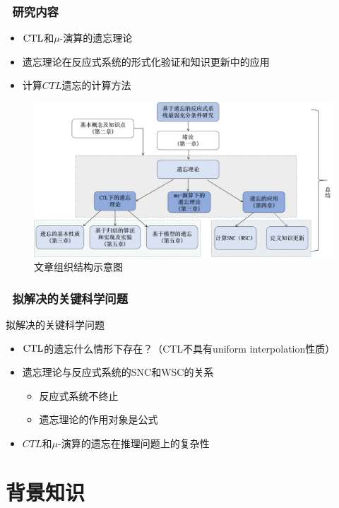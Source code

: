 \documentclass[9pt, CJK]{beamer}
\begin{document}
\begin{frame}
	\frametitle{~研究内容}
		\begin{itemize}
		\item  $\textrm{CTL}$和$\mu$-演算的遗忘理论
		\item 遗忘理论在反应式系统的形式化验证和知识更新中的应用
		\item 计算$CTL$遗忘的计算方法
	\end{itemize}
	\begin{figure}
		\includegraphics[scale=0.3]{figures/zuzhi}
		\caption{文章组织结构示意图}
	\end{figure}
\end{frame}

\begin{frame}
	\frametitle{~拟解决的关键科学问题}
{\footnotesize
	\begin{block}{拟解决的关键科学问题}
		\begin{itemize}
			\item  $\textrm{CTL}$的遗忘什么情形下存在？（CTL不具有uniform interpolation性质）
			\item 遗忘理论与反应式系统的SNC和WSC的关系
			\begin{itemize}
				\item 反应式系统不终止
				\item 遗忘理论的作用对象是公式
			\end{itemize}
			\item $CTL$和$\mu$-演算的遗忘在推理问题上的复杂性
		\end{itemize}
	\end{block}
}
\end{frame}


\section{背景知识}
\end{document}
